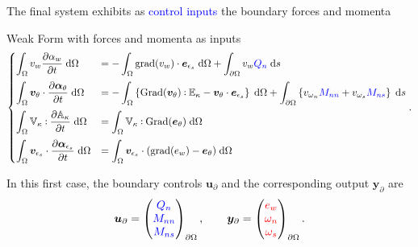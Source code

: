 \documentclass{beamer}
\def\onedot{$\mathsurround0pt\ldotp$}
\def\cddot{%
	\mathbin{\vcenter{\baselineskip.67ex
			\hbox{\onedot}\hbox{\onedot}}%
}}
\newcommand{\blue}[1]{\textcolor{blue}{#1}}
\newcommand{\red}[1]{\textcolor{red}{#1}}
\begin{document}
\begin{frame}
The final system exhibits as \blue{control inputs} the boundary forces and momenta
\begin{exampleblock}{Weak Form with forces and momenta as inputs}
	\scriptsize
	\begin{equation*}
	\begin{cases}
	\displaystyle\int_{\Omega} v_w \diffp{\alpha_w}{t}  \d\Omega  &= - \displaystyle\int_{\Omega} \mathrm{grad}(v_w)  \cdot \bm{e}_{\epsilon_s}  \d\Omega +  \displaystyle\int_{\partial \Omega} v_w \blue{Q_n}  \d s \vspace{2mm}\\
	\displaystyle\int_{\Omega} \bm{v}_{\theta} \cdot \diffp{\bm\alpha_{\theta}}{t}   \d\Omega &=  -\displaystyle\int_{\Omega} \left\{ \mathrm{Grad}(\bm{v}_{\theta}) \cddot \mathbb{E}_{\kappa} - \bm{v}_{\theta} \cdot \bm{e}_{\epsilon_s}\right\}  \d\Omega + \displaystyle\int_{\partial \Omega} \left\{ v_{\omega_n} \blue{M_{nn}} + v_{\omega_s} \blue{M_{ns}} \right\}\d s \vspace{2mm} \\
	\displaystyle\int_{\Omega} \mathbb{V}_{\kappa} \cddot \diffp{\mathbb{A}_{\kappa}}{t}   \d\Omega &= \displaystyle\int_{\Omega} \mathbb{V}_{\kappa} \cddot \mathrm{Grad}(\bm{e}_\theta)  \d\Omega  \vspace{2mm} \\
	\displaystyle\int_{\Omega} \bm{v}_{\epsilon_s} \cdot \diffp{\bm\alpha_{\epsilon_s}}{t}   \d\Omega &= \displaystyle\int_{\Omega} \bm{v}_{\epsilon_s} \cdot (\mathrm{grad}({e}_{w}) - \bm{e}_{\theta})  \d\Omega
	\end{cases}.
	\end{equation*}
\end{exampleblock}

\normalsize{
	In this first case,  the boundary controls $\bm{u}_\partial$ and the corresponding output $\bm{y}_\partial$ are 
	\[\bm{u}_\partial = 
	\begin{pmatrix}
	\blue{{Q}_n } \\
	\blue{M_{nn}} \\
	\blue{M_{ns}} \\
	\end{pmatrix}_{\partial \Omega}, \qquad
	\bm{y}_\partial = 
	\begin{pmatrix}
	\red{e_w} \\
	\red{\omega_n} \\
	\red{\omega_s} \\
	\end{pmatrix}_{\partial \Omega}.
	\]
}
\end{frame}
\end{document}
